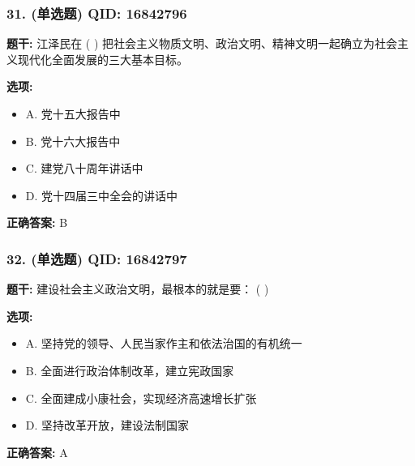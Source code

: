 \documentclass[12pt,UTF8]{ctexart}
\begin{document}
\subsubsection*{31. (单选题) \small QID: 16842796}

\textbf{题干:}
江泽民在 ( ) 把社会主义物质文明、政治文明、精神文明一起确立为社会主义现代化全面发展的三大基本目标。

\textbf{选项:}
\begin{itemize}[leftmargin=*]

  \item A. 党十五大报告中

  \item B. 党十六大报告中

  \item C. 建党八十周年讲话中

  \item D. 党十四届三中全会的讲话中

\end{itemize}

\textbf{正确答案:}
B

\vspace{0.3em}\hrulefill\vspace{0.7em}

\subsubsection*{32. (单选题) \small QID: 16842797}

\textbf{题干:}
建设社会主义政治文明，最根本的就是要： ( )

\textbf{选项:}
\begin{itemize}[leftmargin=*]

  \item A. 坚持党的领导、人民当家作主和依法治国的有机统一

  \item B. 全面进行政治体制改革，建立宪政国家

  \item C. 全面建成小康社会，实现经济高速增长扩张

  \item D. 坚持改革开放，建设法制国家

\end{itemize}

\textbf{正确答案:}
A

\vspace{0.3em}\hrulefill\vspace{0.7em}
\end{document}
